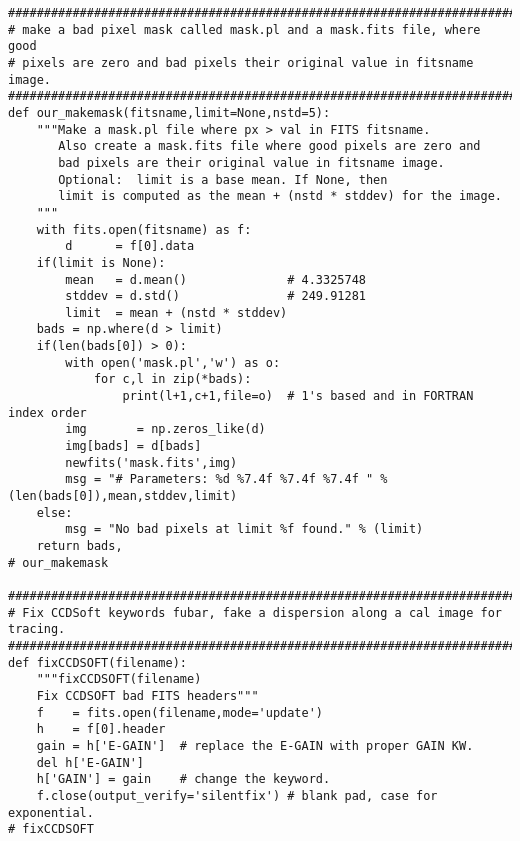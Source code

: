 {\begin{verbatim}
#############################################################################
# make a bad pixel mask called mask.pl and a mask.fits file, where good
# pixels are zero and bad pixels their original value in fitsname image.
#############################################################################
def our_makemask(fitsname,limit=None,nstd=5):
    """Make a mask.pl file where px > val in FITS fitsname.
       Also create a mask.fits file where good pixels are zero and
       bad pixels are their original value in fitsname image.
       Optional:  limit is a base mean. If None, then
       limit is computed as the mean + (nstd * stddev) for the image.
    """
    with fits.open(fitsname) as f:
        d      = f[0].data
    if(limit is None):
        mean   = d.mean()              # 4.3325748
        stddev = d.std()               # 249.91281
        limit  = mean + (nstd * stddev)
    bads = np.where(d > limit)
    if(len(bads[0]) > 0):
        with open('mask.pl','w') as o:
            for c,l in zip(*bads):
                print(l+1,c+1,file=o)  # 1's based and in FORTRAN index order
        img       = np.zeros_like(d)
        img[bads] = d[bads]
        newfits('mask.fits',img)
        msg = "# Parameters: %d %7.4f %7.4f %7.4f " % (len(bads[0]),mean,stddev,limit)
    else:
        msg = "No bad pixels at limit %f found." % (limit)
    return bads,
# our_makemask

#############################################################################
# Fix CCDSoft keywords fubar, fake a dispersion along a cal image for tracing.
#############################################################################
def fixCCDSOFT(filename):
    """fixCCDSOFT(filename)
    Fix CCDSOFT bad FITS headers"""
    f    = fits.open(filename,mode='update')
    h    = f[0].header
    gain = h['E-GAIN']  # replace the E-GAIN with proper GAIN KW.
    del h['E-GAIN']
    h['GAIN'] = gain    # change the keyword.
    f.close(output_verify='silentfix') # blank pad, case for exponential.
# fixCCDSOFT


\end{verbatim}}
